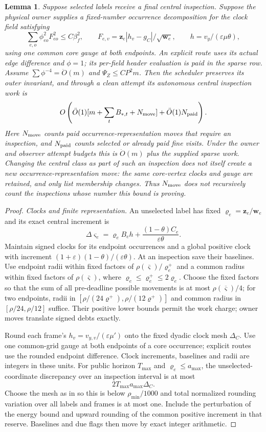 \documentclass[11pt]{article}
\newtheorem{lemma}[theorem]{Lemma}
\theoremstyle{remark}
\newcommand{\ww}{\mathbf w}
\newcommand{\zz}{\mathbf z}
\newcommand{\vvs}{\boldsymbol{\varsigma}}
\newcommand{\vvsbar}{\overline{\boldsymbol{\varsigma}}}
\newcommand{\vvr}{\boldsymbol{\varrho}}
\renewcommand{\O}{\ddot{O}}
\begin{document}
\begin{lemma}
\label{lem:ram-central-scheduler}
Suppose selected labels receive a final central inspection.
Suppose the physical owner supplies a fixed-number occurrence decomposition for
the clock field satisfying
\[
 \sum_{e,o}\phi_{eo}^2F_{eo}^2\le C\beta_f^2,
 \qquad
 F_{e,v}=\zz_e|h_v-g_C|/\sqrt{\ww_e},
 \qquad h=v_y/(\varepsilon\mu\theta),
\]
using one common core gauge at both endpoints.
An explicit route uses its actual edge difference and $\phi=1$; its per-field
header evaluation is paid in the sparse row.
Assume $\sum\phi^{-4}=\O(m)$ and $\Psi_Z\le CP^2m$.
Then the scheduler preserves its outer invariant, and through a clean attempt
its autonomous central inspection work is
\[
 O\left(\O(1)
                    [m+\sum_t B_{*,t}+N_{\rm move}]
       +\O(1)N_{\rm paid}\right).
\]
Here $N_{\rm move}$ counts paid occurrence-representation moves that require an
inspection, and $N_{\rm paid}$ counts selected or already paid fine visits.
Under the owner and observer attempt budgets this is $\O(m)$ plus the
supplied sparse work.
Changing the central class as part of such an inspection does not itself create
a new occurrence-representation move: the same core-vertex clocks and gauge are
retained, and only list membership changes.
Thus $N_{\rm move}$ does not recursively count the inspections whose number this
bound is proving.
\end{lemma} \begin{proof} \emph{Clocks and finite representation.} An unselected
label has fixed $\vvr_e=\zz_e/\ww_e$ and its exact central increment is
\[
 \Delta\vvs_e=\vvr_e B_eh+
              \frac{(1-\theta)C_e}{\varepsilon\theta}.
\]
Maintain signed clocks for its endpoint occurrences and a global positive clock
with increment $(1+\varepsilon)(1-\theta)/(\varepsilon\theta)$.
At an inspection save their baselines.
Use endpoint radii within fixed factors of $\rho(\vvsbar)/\vvr_e^+$ and a common radius
within fixed factors of $\rho(\vvsbar)$, where $\vvr_e\le \vvr_e^+\le2\vvr_e$.
Choose the fixed factors so that the sum of all pre-deadline possible movements
is at most $\rho(\vvsbar)/4$; for two endpoints, radii in
$[\rho/(24\vvr^+),\rho/(12\vvr^+)]$ and common radius in $[\rho/24,\rho/12]$ suffice.
Their positive lower bounds permit the work charge; owner moves translate signed
debts exactly.

Round each frame's $h_v=v_{y,v}/(\varepsilon\mu')$ onto the fixed dyadic clock
mesh $\Delta_C$.
Use one common-grid gauge at both endpoints of a core occurrence; explicit
routes use the rounded endpoint difference.
Clock increments, baselines and radii are integers in these units.
For public horizon $T_{\max}$ and $\vvr_e\le a_{\max}$, the unselected-coordinate
discrepancy over an inspection interval is at most
\[
 2T_{\max}a_{\max}\Delta_C.
\]
Choose the mesh as in  so this is below
$\rho_{\min}/1000$ and total normalized rounding variation over all labels and
frames is at most one.
Include the perturbation of the energy bound and upward rounding of the common
positive increment in that reserve.
Baselines and due flags then move by exact integer arithmetic.


\end{proof}
\end{document}

